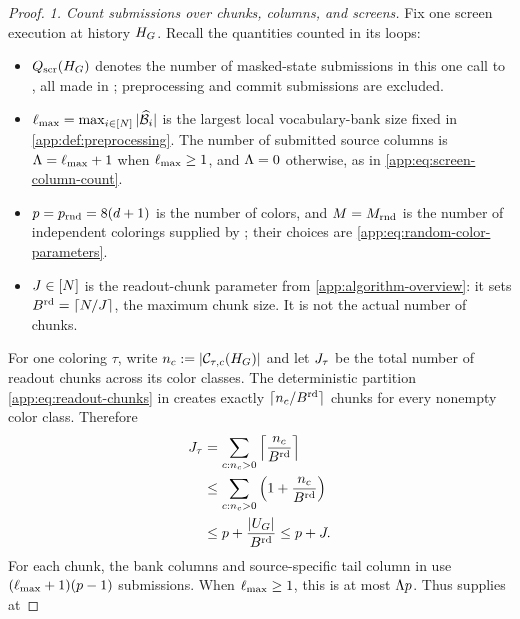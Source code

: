 \begin{proof}

\emph{1. Count submissions over chunks, columns, and screens.}
Fix one screen execution at history $H_{G}$.  Recall the quantities
counted in its loops:
\begin{itemize}
\item $Q_{\mathrm{scr}}(H_{G})$ denotes the number of masked-state submissions in
this one call to , all made in
; preprocessing and commit submissions are excluded.
\item $\ell_{\max}=\max_{i\in[N]}|\widehat{\mathcal B}_{i}|$ is the largest
local vocabulary-bank size fixed in \cref{app:def:preprocessing}.
The number of submitted source columns is
$\Lambda=\ell_{\max}+1$ when $\ell_{\max}\ge1$, and
$\Lambda=0$ otherwise, as in \eqref{app:eq:screen-column-count}.
\item $p=p_{\mathrm{rnd}}=8(d+1)$ is the number of
colors, and $M=M_{\mathrm{rnd}}$ is the number of
independent colorings supplied by ;
their choices are \eqref{app:eq:random-color-parameters}.
\item $J\in[N]$ is the readout-chunk parameter from
\cref{app:algorithm-overview}: it sets
$B^{\mathrm{rd}}=\lceil N/J\rceil$, the maximum chunk size.
It is not the actual number of chunks.
\end{itemize}
For one coloring $\tau$, write $n_c:=|\mathcal C_{\tau,c}(H_{G})|$ and let
$J_{\tau}$ be the total number of readout chunks across
its color classes.  The deterministic partition
\eqref{app:eq:readout-chunks} in  creates exactly
$\lceil n_c/B^{\mathrm{rd}}\rceil$ chunks for every nonempty color class.
Therefore
\begin{align}
 J_{\tau}
 &=\sum_{c:n_c>0}
   \left\lceil\frac{n_c}{B^{\mathrm{rd}}}\right\rceil\notag\\
 &\le\sum_{c:n_c>0}
   \left(1+\frac{n_c}{B^{\mathrm{rd}}}\right)\notag\\
 &\le p+\frac{|U_{G}|}{B^{\mathrm{rd}}}
 \le p+J.
 \label{app:eq:proof-chunk-count}
\end{align}
For each chunk, the bank columns and source-specific tail column in
 use
$(\ell_{\max}+1)(p-1)$ submissions.  When
$\ell_{\max}\ge1$, this is at most
$\Lambda p$.  Thus  supplies at

\end{proof}
